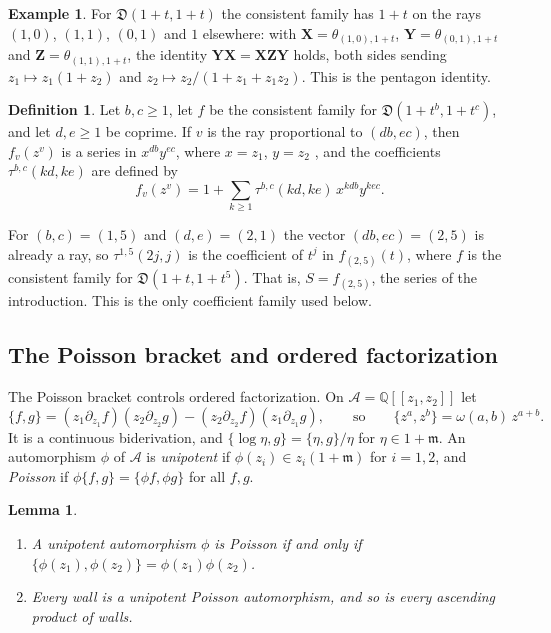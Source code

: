 \documentclass[11pt]{article}
\newtheorem{lemma}[theorem]{Lemma}
\theoremstyle{definition}
\newtheorem{definition}[theorem]{Definition}
\newtheorem{example}[theorem]{Example}
\theoremstyle{remark}
\numberwithin{equation}{section}
\newcommand{\Q}{\mathbb{Q}}
\newcommand{\ps}[1]{\Q[\![#1]\!]}
\newcommand{\m}{\mathfrak{m}}
\newcommand{\bX}{\mathbf{X}}
\newcommand{\bY}{\mathbf{Y}}
\newcommand{\bZ}{\mathbf{Z}}
\begin{document}
\begin{example}\label{ex:pentagon}
For $\mathfrak{D}(1+t,1+t)$ the consistent family has $1+t$ on the rays
$(1,0)$, $(1,1)$, $(0,1)$ and $1$ elsewhere: with
$\bX=\theta_{(1,0),1+t}$, $\bY=\theta_{(0,1),1+t}$ and
$\bZ=\theta_{(1,1),1+t}$, the identity $\bY\bX=\bX\bZ\bY$ holds, both
sides sending $z_1\mapsto z_1(1+z_2)$ and
$z_2\mapsto z_2/(1+z_1+z_1z_2)$. This is the pentagon identity.
\end{example}

\begin{definition}\label{def:tau}
Let $b,c\geq1$, let $f$ be the consistent family for
$\mathfrak{D}(1+t^b,1+t^c)$, and let $d,e\geq1$ be coprime. If $v$ is the
ray proportional to $(db,ec)$, then $f_v(z^v)$ is a series in
$x^{db}y^{ec}$, where $x=z_1$, $y=z_2$ \cite[\S2]{BLMMR}, and the
coefficients $\tau^{b,c}(kd,ke)$ are defined \cite[(2.2)]{BLMMR} by
\[
  f_v(z^v)=1+\sum_{k\geq1}\tau^{b,c}(kd,ke)\,x^{kdb}y^{kec}.
\]
\end{definition}

For $(b,c)=(1,5)$ and $(d,e)=(2,1)$ the vector $(db,ec)=(2,5)$ is
already a ray, so $\tau^{1,5}(2j,j)$ is the coefficient of $t^j$ in
$f_{(2,5)}(t)$, where $f$ is the consistent family for
$\mathfrak{D}(1+t,1+t^5)$. That is, $S=f_{(2,5)}$, the series of the
introduction. This is the only coefficient family used below.

\subsection{The Poisson bracket and ordered factorization}
The Poisson bracket controls ordered factorization.
On $\mathcal{A}=\ps{z_1,z_2}$ let
\[
  \{f,g\}=(z_1\partial_{z_1}f)(z_2\partial_{z_2}g)-(z_2\partial_{z_2}f)(z_1\partial_{z_1}g),
  \qquad\text{so}\qquad \{z^a,z^b\}=\omega(a,b)\,z^{a+b}.
\]
It is a continuous biderivation, and $\{\log\eta,g\}=\{\eta,g\}/\eta$ for
$\eta\in1+\m$. An automorphism $\phi$ of
$\mathcal{A}$ is \emph{unipotent} if $\phi(z_i)\in z_i(1+\m)$ for
$i=1,2$, and \emph{Poisson} if $\phi\{f,g\}=\{\phi f,\phi g\}$ for all
$f,g$.

\begin{lemma}\label{lem:walls}
\begin{enumerate}
\item A unipotent automorphism $\phi$ is Poisson if and only if
$\{\phi(z_1),\phi(z_2)\}=\phi(z_1)\phi(z_2)$.
\item Every wall is a unipotent Poisson automorphism, and so is every
ascending product of walls.
\end{enumerate}
\end{lemma}
\end{document}
